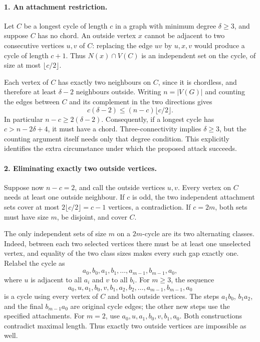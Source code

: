 \documentclass[11pt,a4paper]{article}
\begin{document}
\paragraph{1. An attachment restriction.}
Let $C$ be a longest cycle of length $c$ in a graph with minimum
degree $\delta\ge3$, and suppose $C$ has no chord. An outside
vertex $x$ cannot be adjacent to two consecutive vertices $u,v$ of
$C$: replacing the edge $uv$ by $u,x,v$ would produce a cycle of
length $c+1$. Thus $N(x)\cap V(C)$ is an independent set on the
cycle, of size at most $\lfloor c/2\rfloor$.

Each vertex of $C$ has exactly two neighbours on $C$, since it is
chordless, and therefore at least $\delta-2$ neighbours outside.
Writing $n=|V(G)|$ and counting the edges between $C$ and its
complement in the two directions gives
\[
 c(\delta-2)\le(n-c)\lfloor c/2\rfloor.
\]
In particular $n-c\ge2(\delta-2)$. Consequently, if a longest cycle
has $c>n-2\delta+4$, it must have a chord. Three-connectivity implies
$\delta\ge3$, but the counting argument itself needs only that degree
condition. This explicitly identifies the extra circumstance under
which the proposed attack succeeds.

\paragraph{2. Eliminating exactly two outside vertices.}
Suppose now $n-c=2$, and call the outside vertices $u,v$. Every
vertex on $C$ needs at least one outside neighbour. If $c$ is odd,
the two independent attachment sets cover at most
$2\lfloor c/2\rfloor=c-1$ vertices, a contradiction. If $c=2m$,
both sets must have size $m$, be disjoint, and cover $C$.

The only independent sets of size $m$ on a $2m$-cycle are its two
alternating classes. Indeed, between each two selected vertices there
must be at least one unselected vertex, and equality of the two
class sizes makes every such gap exactly one. Relabel the cycle as
\[
 a_0,b_0,a_1,b_1,\ldots,a_{m-1},b_{m-1},a_0,
\]
where $u$ is adjacent to all $a_i$ and $v$ to all $b_i$.
For $m\ge3$, the sequence
\[
 a_0,u,a_1,b_0,v,b_1,a_2,b_2,\ldots,a_{m-1},b_{m-1},a_0
\]
is a cycle using every vertex of $C$ and both outside vertices.
The steps $a_1b_0$, $b_1a_2$, and the final
$b_{m-1}a_0$ are original cycle edges; the other new steps use
the specified attachments. For $m=2$, use
$a_0,u,a_1,b_0,v,b_1,a_0$. Both constructions contradict maximal
length. Thus exactly two outside vertices are impossible as well.
\end{document}
